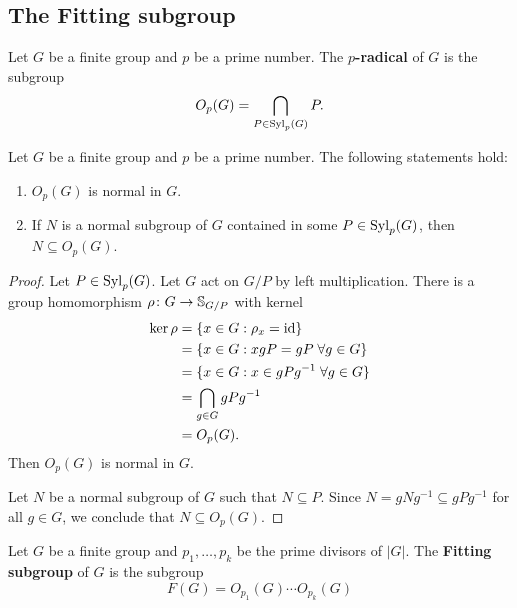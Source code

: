 \section{}

\subsection{The Fitting subgroup}

\begin{definition}
Let $G$ be a finite group and $p$ be a prime number. 
The \textbf{$p$-radical} of $G$ is the subgroup 
\[
O_p(G)=\bigcap_{P\in\mathrm{Syl}_p(G)}P.
\]
\end{definition}

\begin{lemma}
\label{lem:core:Op(G)}
Let $G$ be a finite group and $p$ be a prime number. The following statements hold: 
\begin{enumerate}
    \item $O_p(G)$ is normal in $G$.
    \item If $N$ is a normal subgroup of $G$ contained in some 
    $P\in\mathrm{Syl}_p(G)$, then $N\subseteq O_p(G)$.
\end{enumerate}
\end{lemma}

\begin{proof}
Let $P\in\mathrm{Syl}_p(G)$. Let $G$ act on $G/P$ by left multiplication. There is a group homomorphism 
$\rho\colon G\to\mathbb{S}_{G/P}$ with kernel 
\begin{align*}
		\ker\rho&=\{x\in G:\rho_x=\operatorname{id}\}\\
		&=\{x\in G:xgP=gP\;\forall g\in G\}\\
		&=\{x\in G:x\in gPg^{-1}\;\forall g\in G\}\\
    &=\bigcap_{g\in G}gPg^{-1}\\
    &=O_p(G).
\end{align*}
Then $O_p(G)$ is normal in $G$.

Let $N$ be a normal subgroup of $G$ such that $N\subseteq P$. Since 
$N=gNg^{-1}\subseteq gPg^{-1}$ for all $g\in G$, we conclude that 
$N\subseteq O_p(G)$.
\end{proof}

\begin{definition}
Let $G$ be a finite group and $p_1,\dots,p_k$ be the prime divisors of 
$|G|$. The \textbf{Fitting subgroup} of $G$ is the subgroup 
\[
F(G)=O_{p_1}(G)\cdots O_{p_k}(G)
\]
\end{definition}

